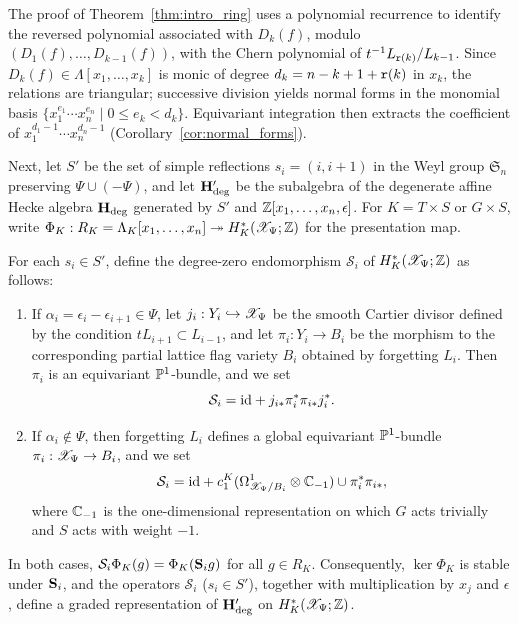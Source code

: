 The proof of Theorem~\ref{thm:intro_ring} uses a polynomial recurrence to identify the reversed polynomial associated with $D_k(f)$, modulo $(D_1(f),\dots,D_{k-1}(f))$, with the Chern polynomial of $t^{-1}L_{\mathtt r(k)}/L_{k-1}$. Since $D_k(f)\in\Lambda[x_1,\dots,x_k]$ is monic of degree $d_k=n-k+1+\mathtt r(k)$ in $x_k$, the relations are triangular; successive division yields normal forms in the monomial basis $\{x_1^{e_1}\cdots x_n^{e_n}\mid 0\leq e_k<d_k\}$. Equivariant integration then extracts the coefficient of $x_1^{d_1-1}\cdots x_n^{d_n-1}$ (Corollary~\ref{cor:normal_forms}).

Next, let $S'$ be the set of simple reflections $s_i=(i,i+1)$ in the Weyl group $\mathfrak S_n$ preserving $\Psi\cup(-\Psi)$, and let $\mathbf H_{\mathrm{deg}}'$ be the subalgebra of the degenerate affine Hecke algebra $\mathbf H_{\mathrm{deg}}$ generated by $S'$ and $\mathbb Z[x_1,\dots,x_n,\epsilon]$. For $K=T\times S$ or $G\times S$, write $\Phi_K:R_K=\Lambda_K[x_1,\dots,x_n]\twoheadrightarrow H_K^*(\mathscr X_\Psi;\mathbb Z)$ for the presentation map.

\begin{theorem}\label{thm:intro_hecke}
For each $s_i\in S'$, define the degree-zero endomorphism $\mathcal S_i$ of $H_K^*(\mathscr X_\Psi;\mathbb Z)$ as follows:
\begin{enumerate}
\item If $\alpha_i=\epsilon_i-\epsilon_{i+1}\in\Psi$, let $j_i:Y_i\hookrightarrow\mathscr X_\Psi$ be the smooth Cartier divisor defined by the condition $tL_{i+1}\subset L_{i-1}$, and let $\pi_i:Y_i\to B_i$ be the morphism to the corresponding partial lattice flag variety $B_i$ obtained by forgetting $L_i$. Then $\pi_i$ is an equivariant $\mathbb P^1$-bundle, and we set
\[
 \mathcal S_i=\mathrm{id}+j_{i*}\pi_i^*\pi_{i*}j_i^*.
\]
\item If $\alpha_i\notin\Psi$, then forgetting $L_i$ defines a global equivariant $\mathbb P^1$-bundle $\pi_i:\mathscr X_\Psi\to B_i$, and we set
\[
 \mathcal S_i=\mathrm{id}+c_1^K(\Omega^1_{\mathscr X_\Psi/B_i}\otimes\mathbb C_{-1})\cup\pi_i^*\pi_{i*},
\]
where $\mathbb C_{-1}$ is the one-dimensional representation on which $G$ acts trivially and $S$ acts with weight $-1$.
\end{enumerate}
In both cases, $\mathcal S_i\Phi_K(g)=\Phi_K(\mathbf S_i g)$ for all $g\in R_K$. Consequently, $\ker\Phi_K$ is stable under $\mathbf S_i$, and the operators $\mathcal S_i$ ($s_i\in S'$), together with multiplication by $x_j$ and $\epsilon$, define a graded representation of $\mathbf H_{\mathrm{deg}}'$ on $H_K^*(\mathscr X_\Psi;\mathbb Z)$.
\end{theorem}

